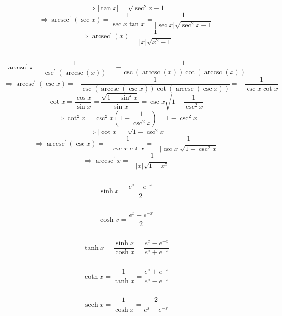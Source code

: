 \documentclass[a0paper,landscape,fleqn]{article}
\DeclareMathOperator{\arcsec}{arcsec}
\DeclareMathOperator{\arccsc}{arccsc}
\DeclareMathOperator{\sech}{sech}
\begin{document}
\begin{equation*}
\Rightarrow|\tan x|
=\sqrt{\sec^2 x-1}
\end{equation*}
\begin{equation*}
\Rightarrow\arcsec^\prime(\sec x)
=\frac{1}{\sec x\tan x}
=\frac{1}{|\sec x|\sqrt{\sec^2 x-1}}
\end{equation*}
\begin{equation*}
\Rightarrow\arcsec^\prime(x)
=\frac{1}{|x|\sqrt{x^2-1}}
\end{equation*}
\hrule%
\begin{equation*}
\arccsc^\prime x
=\frac{1}{\csc^\prime(\arccsc(x))}
=-\frac{1}{\csc(\arccsc(x))\cot(\arccsc(x))}
\end{equation*}
\begin{equation*}
\Rightarrow\arccsc^\prime (\csc x)
=-\frac{1}{\csc(\arccsc(\csc x))\cot(\arccsc(\csc x))}
=-\frac{1}{\csc x\cot x}
\end{equation*}
\begin{equation*}
\cot x
=\frac{\cos x}{\sin x}
=\frac{\sqrt{1-\sin^2 x}}{\sin x}
=\csc x\sqrt{1-\frac{1}{\csc^2 x}}
\end{equation*}
\begin{equation*}
\Rightarrow\cot^2 x
=\csc^2 x\left(1-\frac{1}{\csc^2 x}\right)
=1-\csc^2 x
\end{equation*}
\begin{equation*}
\Rightarrow|\cot x|
=\sqrt{1-\csc^2 x}
\end{equation*}
\begin{equation*}
\Rightarrow\arccsc^\prime (\csc x)
=-\frac{1}{\csc x\cot x}
=-\frac{1}{|\csc x|\sqrt{1-\csc^2 x}}
\end{equation*}
\begin{equation*}
\Rightarrow\arccsc^\prime x
=-\frac{1}{|x|\sqrt{1-x^2}}
\end{equation*}
\hrule
\begin{equation*}
\sinh x=\frac{e^x-e^{-x}}{2}
\end{equation*}
\hrule
\begin{equation*}
\cosh x=\frac{e^x+e^{-x}}{2}
\end{equation*}
\hrule
\begin{equation*}
\tanh x=\frac{\sinh x}{\cosh x}=\frac{e^x-e^{-x}}{e^x+e^{-x}}
\end{equation*}
\hrule
\begin{equation*}
\coth x=\frac{1}{\tanh x}=\frac{e^x+e^{-x}}{e^x-e^{-x}}
\end{equation*}
\hrule
\begin{equation*}
\sech x=\frac{1}{\cosh x}=\frac{2}{e^x+e^{-x}}
\end{equation*}
\end{document}
